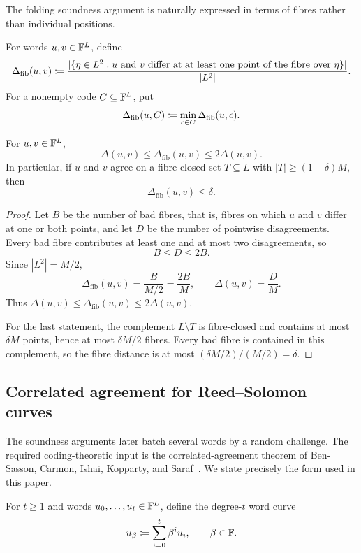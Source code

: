 The folding soundness argument is naturally expressed in terms of fibres rather than individual positions.

\begin{definition}
\label{def:fibre-distance}
For words $u,v\in\mathbb{F}^L$, define
\[
  \Delta_{\mathrm{fib}}(u,v)
  \coloneqq
  \frac{
    |\{\eta\in L^2:\text{$u$ and $v$ differ at at least one point of the fibre over $\eta$}\}|
  }{|L^2|}.
\]
For a nonempty code $C\subseteq\mathbb{F}^L$, put
\[
  \Delta_{\mathrm{fib}}(u,C)
  \coloneqq
  \min_{c\in C}\Delta_{\mathrm{fib}}(u,c).
\]
\end{definition}

\begin{lemma}
\label{lem:hamming-fibre}
For $u,v\in\mathbb{F}^L$,
\[
  \Delta(u,v)\le\Delta_{\mathrm{fib}}(u,v)\le 2\Delta(u,v).
\]
In particular, if $u$ and $v$ agree on a fibre-closed set $T\subseteq L$ with $|T|\ge(1-\delta)M$, then
\[
  \Delta_{\mathrm{fib}}(u,v)\le\delta.
\]
\end{lemma}

\begin{proof}
Let $B$ be the number of bad fibres, that is, fibres on which $u$ and $v$ differ at one or both points, and let $D$ be the number of pointwise disagreements.  Every bad fibre contributes at least one and at most two disagreements, so
\[
  B\le D\le2B.
\]
Since $|L^2|=M/2$,
\[
  \Delta_{\mathrm{fib}}(u,v)=\frac{B}{M/2}=\frac{2B}{M},
  \qquad
  \Delta(u,v)=\frac DM.
\]
Thus $\Delta(u,v)\le\Delta_{\mathrm{fib}}(u,v)\le2\Delta(u,v)$.

For the last statement, the complement $L\setminus T$ is fibre-closed and contains at most $\delta M$ points, hence at most $\delta M/2$ fibres.  Every bad fibre is contained in this complement, so the fibre distance is at most $(\delta M/2)/(M/2)=\delta$.
\end{proof}

\subsection{Correlated agreement for Reed--Solomon curves}
\label{sec:preliminaries-correlated-agreement}

The soundness arguments later batch several words by a random challenge.  The required coding-theoretic input is the correlated-agreement theorem of Ben-Sasson, Carmon, Ishai, Kopparty, and Saraf~\cite{BSCI23}.  We state precisely the form used in this paper.

For $t\ge1$ and words $u_0,\ldots,u_t\in\mathbb{F}^L$, define the degree-$t$ word curve
\begin{equation}
  u_\beta\coloneqq\sum_{i=0}^{t}\beta^iu_i,
  \qquad \beta\in\mathbb{F}.
  \label{eq:word-curve}
\end{equation}

